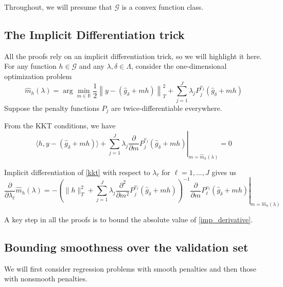 \documentclass[12pt]{article}
\begin{document}
Throughout, we will presume that $\mathcal{G}$ is a convex function class. 

\subsection{The Implicit Differentiation trick}
\label{sec:imp_diff}

All the proofs rely on an implicit differentiation trick, so we will highlight it here. For any function $h \in \mathcal{G}$ and any $\lambda, \delta \in \Lambda$, consider the one-dimensional optimization problem
\begin{equation}
\label{one_dim_opt}
\hat{m}_{h}(\lambda)=\arg\min_{m \in \mathbb{R}}\frac{1}{2} \left \|y-(\hat{g}_{\delta}+mh) \right \|_{T}^{2} + \sum_{j=1}^J \lambda_j P_j^{v_j}(\hat{g}_\delta+mh)
\end{equation}
Suppose the penalty functions $P_j$ are twice-differentiable everywhere.

From the KKT conditions, we have
\begin{equation}
\label{kkt}
\left . \langle h, y - (\hat{g}_{\delta}+mh) \rangle + \sum_{j=1}^J \lambda_j \frac{\partial}{\partial m } P_j^{v_j}(\hat{g}_\delta+mh)  \right |_{m = \hat{m}_{h}(\lambda)}= 0
\end{equation}

Implicit differentiation of \eqref{kkt} with respect to $\lambda_\ell$ for $\ell = 1, ..., J$ gives us
\begin{equation}
\label{imp_derivative}
\frac{\partial}{\partial\lambda_{\ell}}\hat{m}_{h}(\lambda) =
- \left.
\left( \|h\|_{T}^{2} + \sum_{j=1}^J \lambda_j \frac{\partial^{2}}{\partial m^{2}}P_j^{v_j} (\hat{g}_{\delta}+mh ) \right)^{-1}
\frac{\partial}{\partial m}P_{\ell}^{v_{\ell}}(\hat{g}_\delta+mh)
\right |_{m=\hat{m}_{h}(\lambda)}
\end{equation}

A key step in all the proofs is to bound the absolute value of \eqref{imp_derivative}.

\subsection{Bounding smoothness over the validation set}
\label{sec:entropy_1}

We will first consider regression problems with smooth penalties and then those with nonsmooth penalties.
\end{document}
